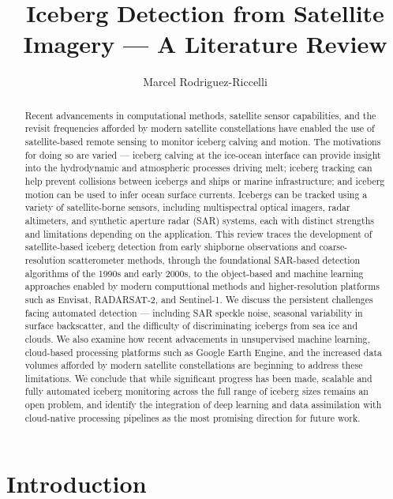 \documentclass[11pt, letterpaper]{article}
\title{Iceberg Detection from Satellite Imagery --- A Literature Review}
\author{Marcel Rodriguez-Riccelli}
\begin{document}
\maketitle
\thispagestyle{empty}

\begin{abstract}

Recent advancements in computational methods, satellite sensor capabilities, and the 
revisit frequencies afforded by modern satellite constellations have enabled the 
use of satellite-based remote sensing to monitor iceberg calving and motion. The 
motivations for doing so are varied --- iceberg calving at the ice-ocean interface 
can provide insight into the hydrodynamic and atmospheric processes driving melt; 
iceberg tracking can help prevent collisions between icebergs and ships or marine 
infrastructure; and iceberg motion can be used to infer ocean surface currents. 
Icebergs can be tracked using a variety of satellite-borne sensors, including 
multispectral optical imagers, radar altimeters, and synthetic aperture radar (SAR) 
systems, each with distinct strengths and limitations depending on the application. 
This review traces the development of satellite-based iceberg detection from early 
shipborne observations and coarse-resolution scatterometer methods, through the 
foundational SAR-based detection algorithms of the 1990s and early 2000s, to the 
object-based and machine learning approaches enabled by modern computtional methods and higher-resolution platforms such as Envisat, RADARSAT-2, and Sentinel-1. We discuss the persistent challenges facing automated detection --- including SAR speckle noise, seasonal variability in surface backscatter, and the difficulty of discriminating icebergs from sea ice and clouds. We also examine how recent advacements in unsupervised machine learning, cloud-based processing platforms such as Google Earth Engine, and the increased data volumes afforded by modern satellite constellations are beginning to address these limitations. We conclude that while significant progress has been made, scalable and fully automated iceberg monitoring across the full range of iceberg sizes remains an open problem, and identify the integration of deep learning and data assimilation with cloud-native processing pipelines as the most promising direction for future work.

\end{abstract}

\section{Introduction}
\end{document}
